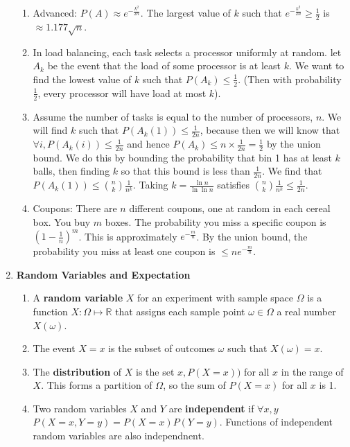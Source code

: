 \documentclass[10pt]{article}
\begin{document}
\begin{multicols}{2}
\begin{enumerate}
\begin{enumerate}
            \item Advanced: $P(A) \approx e^{- \frac{k^2}{2n}}$. The largest value of $k$ such that $e^{- \frac{k^2}{2n}} \geq \frac{1}{2}$ is $\approx 1.177 \sqrt{n}$.
            
            \item In load balancing, each task selects a processor uniformly at random. let $A_k$ be the event that the load of some processor is at least $k$. We want to find the lowest value of $k$ such that $P(A_k) \leq \frac{1}{2}$. (Then with probability $\frac{1}{2}$, every processor will have load at most $k$). 
            \item Assume the number of tasks is equal to the number of processors, $n$. We will find $k$ such that $P(A_k(1)) \leq \frac{1}{2n}$, because then we will know that $\forall i, P(A_k(i)) \leq \frac{1}{2n}$ and hence $P(A_k) \leq n \times \frac{1}{2n}=\frac{1}{2}$ by the union bound. We do this by bounding the probability that bin 1 has at least $k$ balls, then finding $k$ so that this bound is less than $\frac{1}{2n}$. We find that $P(A_k(1)) \leq {n \choose k} \frac{1}{n^k}$. Taking $k=\frac{\ln n}{\ln \ln n}$ satisfies ${n \choose k} \frac{1}{n^k} \leq \frac{1}{2n}$.
            
            \item Coupons: There are $n$ different coupons, one at random in each cereal box. You buy $m$ boxes. The probability you miss a specific coupon is $(1-\frac{1}{n})^m$. This is approximately $e^{-\frac{m}{n}}$. By the union bound, the probability you miss at least one coupon is $\leq ne^{-\frac{m}{n}}$.
        \end{enumerate}
        \item \textbf{Random Variables and Expectation}
        \begin{enumerate}
            \item A \textbf{random variable} $X$ for an experiment with sample space $\Omega$ is a function $X: \Omega \mapsto \mathbb{R}$ that assigns each sample point $\omega \in \Omega$ a real number $X(\omega)$. 
            \item The event $X = x$ is the subset of outcomes $\omega$ such that $X(\omega)=x$.
            \item The \textbf{distribution} of $X$ is the set $x, P(X = x))$ for all $x$ in the range of $X$. This forms a partition of $\Omega$, so the sum of $P(X = x)$ for all $x$ is 1.
            \item Two random variables $X$ and $Y$ are \textbf{independent} if $\forall x, y$ $P(X = x,Y=y)=P(X=x)P(Y=y)$. Functions of independent random variables are also independnent. 
            

\end{enumerate}
\end{enumerate}
\end{multicols}
\end{document}
